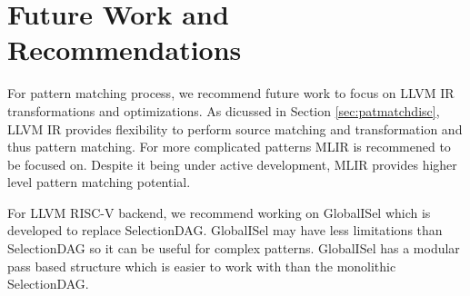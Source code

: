 \section{Future Work and Recommendations}
For pattern matching process, we recommend future work to focus on LLVM IR transformations and optimizations. As dicussed in Section \ref{sec:patmatchdisc}, LLVM IR provides flexibility to perform source matching and transformation and thus pattern matching. For more complicated patterns MLIR is recommened to be focused on. Despite it being under active development, MLIR provides higher level pattern matching potential.

For LLVM RISC-V backend, we recommend working on GlobalISel which is developed to replace SelectionDAG. GlobalISel may have less limitations than SelectionDAG so it can be useful for complex patterns. GlobalISel has a modular pass based structure which is easier to work with than the monolithic SelectionDAG.

